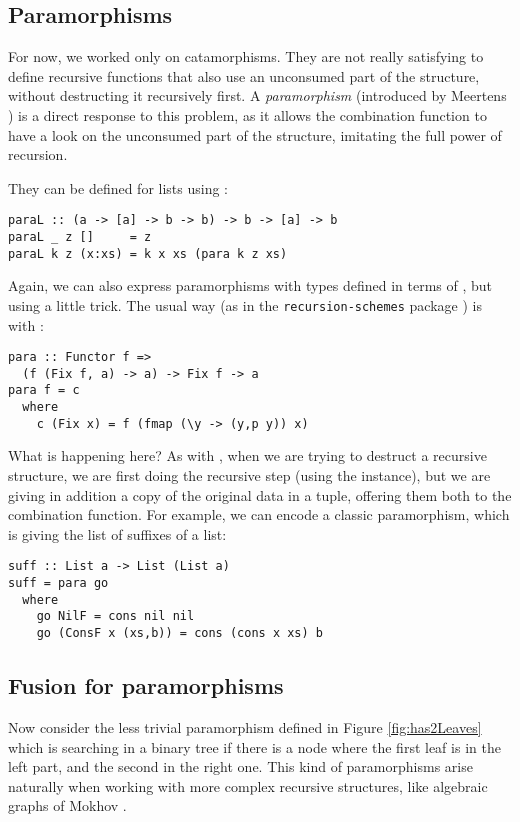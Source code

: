 \subsection{Paramorphisms}
\label{sec:para-list}

For now, we worked only on catamorphisms. They are not really satisfying to define recursive functions that also use an unconsumed part of the structure, without destructing it recursively first. A \emph{paramorphism} (introduced by Meertens \cite{Meertens1992}) is a direct response to this problem, as it allows the combination function to have a look on the unconsumed part of the structure, imitating the full power of recursion.

They can be defined for lists using :
\begin{verbatim}
paraL :: (a -> [a] -> b -> b) -> b -> [a] -> b
paraL _ z []     = z
paraL k z (x:xs) = k x xs (para k z xs)
\end{verbatim}

\noindent Again, we can also express paramorphisms with types defined in terms of , but using a little trick. The usual way (as in the \verb|recursion-schemes| package \cite{ekmett:eschems}) is with :
\begin{verbatim}
para :: Functor f =>
  (f (Fix f, a) -> a) -> Fix f -> a
para f = c
  where
    c (Fix x) = f (fmap (\y -> (y,p y)) x)
\end{verbatim}

\noindent What is happening here? As with , when we are trying to destruct a recursive structure, we are first doing the recursive step (using the  instance), but we are giving in addition a copy of the original data in a tuple, offering them both to the combination function.
For example, we can encode a classic paramorphism, which is giving the list of suffixes of a list:
\begin{verbatim}
suff :: List a -> List (List a)
suff = para go
  where
    go NilF = cons nil nil
    go (ConsF x (xs,b)) = cons (cons x xs) b
\end{verbatim}

\subsection{Fusion for paramorphisms}

Now consider the less trivial paramorphism  defined in Figure \ref{fig:has2Leaves} which is searching in a binary tree if there is a node where the first leaf is in the left part, and the second in the right one. This kind of paramorphisms arise naturally when working with more complex recursive structures, like algebraic graphs of Mokhov \cite{Mokhov:2017:AGC:3156695.3122956}.

